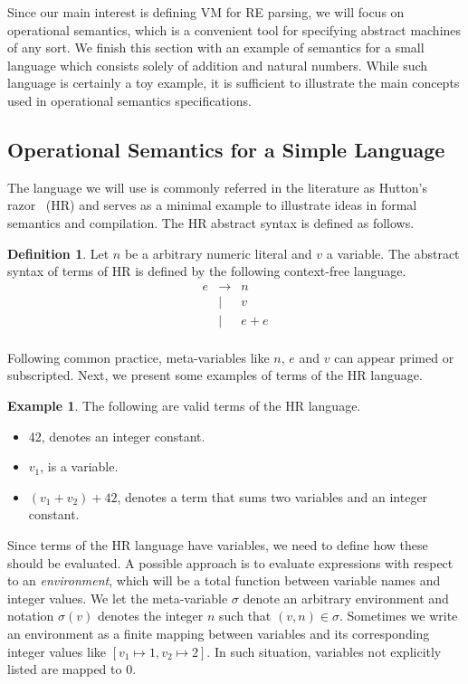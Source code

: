\documentclass[oneside,12pt]{scrbook}
\theoremstyle{definition}
\newtheorem{Example}{Example}
\theoremstyle{plain}
\theoremstyle{definition}
\newtheorem{Definition}{Definition}
\begin{document}
Since our main interest is defining VM for RE parsing, we will focus on operational semantics, which is
a convenient tool for specifying abstract machines of any sort. We finish this section with an example of semantics for
a small language which consists solely of addition and natural numbers. While such language is certainly a toy example,
it is sufficient to illustrate the main concepts used in operational semantics specifications.

\subsection{Operational Semantics for a Simple Language}\label{subsection:simplelanguage}

The language we will use is commonly referred in the literature as Hutton's razor~\cite{Hutton98} (HR) and serves as a minimal
example to illustrate ideas in formal semantics and compilation. The HR abstract syntax is defined as follows.

\begin{Definition}
	Let $n$ be a arbitrary numeric literal and $v$ a variable. The abstract syntax of terms of HR is defined by the following
	context-free language.
	\[
	\begin{array}{lcl}
	e & \to  & n \\
	& \mid & v \\
	& \mid & e + e \\
	\end{array}
	\]
\end{Definition}

Following common practice, meta-variables like $n$, $e$ and $v$ can appear primed or subscripted. Next, we present some
examples of terms of the HR language. 

\begin{Example}
	The following are valid terms of the HR language. 
	\begin{itemize}
		\item 42, denotes an integer constant.
		\item $v_1$, is a variable.
		\item $(v_1 + v_2) + 42$, denotes a term that sums two
		variables and an integer constant.
	\end{itemize}
\end{Example}

Since terms of the HR language have variables, we need to define how these should be evaluated. A possible
approach is to evaluate expressions with respect to an \emph{environment}, which will be a total function
between variable names and integer values. We let the meta-variable $\sigma$ denote an arbitrary environment
and notation $\sigma(v)$ denotes the integer $n$ such that $(v,n) \in \sigma$. Sometimes we write an environment
as a finite mapping between variables and its corresponding integer values like $[v_1 \mapsto 1, v_2 \mapsto 2]$.
In such situation, variables not explicitly listed are mapped to 0.
\end{document}
